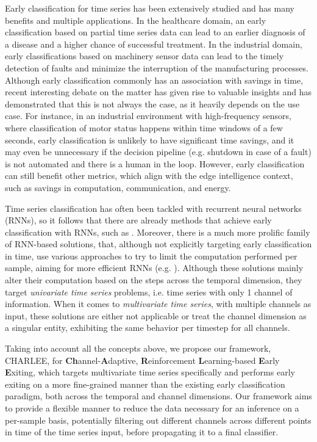 \documentclass[conference]{IEEEtran}
\begin{document}
Early classification for time series has been extensively studied and has many benefits and multiple applications\cite{gupta2020ects}. In the healthcare domain, an early classification based on partial time series data can lead to an earlier diagnosis of a disease and a higher chance of successful treatment. In the industrial domain, early classifications based on machinery sensor data can lead to the timely detection of faults and minimize the interruption of the manufacturing processes. Although early classification commonly has an association with savings in time, recent interesting debate\cite{wu2023whenmeaningful,achenchabe2021meaningful} on the matter has given rise to valuable insights and has demonstrated that this is not always the case, as it heavily depends on the use case. For instance, in an industrial environment with high-frequency sensors, where classification of motor status happens within time windows of a few seconds, early classification is unlikely to have significant time savings, and it may even be unnecessary if the decision pipeline (e.g. shutdown in case of a fault) is not automated and there is a human in the loop. However, early classification can still benefit other metrics, which align with the edge intelligence context, such as savings in computation, communication, and energy.

Time series classification has often been tackled with recurrent neural networks (RNNs), so it follows that there are already methods that achieve early classification with RNNs, such as \cite{dennis2018emirnn,rubwurm2019endtoendlearning,kannan2021budgetrnn}. Moreover, there is a much more prolific family of RNN-based solutions\cite{han2021dynamic}, that, although not explicitly targeting early classification in time, use various approaches to try to limit the computation performed per sample, aiming for more efficient RNNs (e.g. \cite{koutnik2014clockwork,campos2018skiprnn}). Although these solutions mainly alter their computation based on the steps across the temporal dimension, they target \textit{univariate time series} problems, i.e. time series with only 1 channel of information. When it comes to \textit{multivariate time series}, with multiple channels as input, these solutions are either not applicable or treat the channel dimension as a singular entity, exhibiting the same behavior per timestep for all channels.

Taking into account all the concepts above, we propose our framework, CHARLEE, for \textbf{Ch}annel-\textbf{A}daptive, \textbf{R}einforcement \textbf{L}earning-based \textbf{E}arly \textbf{E}xiting, which targets multivariate time series specifically and performs early exiting on a more fine-grained manner than the existing early classification paradigm, both across the temporal and channel dimensions. Our framework aims to provide a flexible manner to reduce the data necessary for an inference on a per-sample basis, potentially filtering out different channels across different points in time of the time series input, before propagating it to a final classifier.
\end{document}
